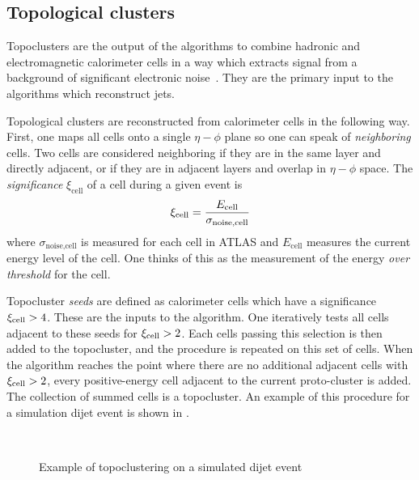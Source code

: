 \subsection{Topological clusters}\label{sec:topoclusters}

Topoclusters are the output of the algorithms to combine hadronic and electromagnetic calorimeter cells in a way which extracts signal from a background of significant electronic noise~\cite{PERF-2014-07}.
They are the primary input to the algorithms which reconstruct jets.

Topological clusters are reconstructed from calorimeter cells in the following way.
First, one maps all cells onto a single $\eta-\phi$ plane so one can speak of \textit{neighboring} cells.
Two cells are considered neighboring if they are in the same layer and directly adjacent, or if they are in adjacent layers and overlap in $\eta-\phi$ space.
The \textit{significance} $\xi_{\text{cell}}$ of a cell during a given event is
\begin{equation}
\xi_{\text{cell}} = \frac{E_{\text{cell}}}{\sigma_{\text{noise,cell}}}
\end{equation}
where $\sigma_{\text{noise,cell}}$ is measured for each cell in ATLAS and $E_{\text{cell}}$ measures the current energy level of the cell.
One thinks of this as the measurement of the energy \textit{over threshold} for the cell.

Topocluster \textit{seeds} are defined as calorimeter cells which have a significance $\xi_{\text{cell}} > 4 $.
These are the inputs to the algorithm.
One iteratively tests all cells adjacent to these seeds for $\xi_{\text{cell}} > 2$.
Each cells passing this selection is then added to the topocluster, and the procedure is repeated on this set of cells.
When the algorithm reaches the point where there are no additional adjacent cells with $\xi_{\text{cell}} > 2$, every positive-energy cell adjacent to the current proto-cluster is added.
The collection of summed cells is a topocluster.
An example of this procedure for a simulation dijet event is shown in .
\begin{figure}
\caption{Example of topoclustering on a simulated dijet event} \label{fig:topocluster}
 \\
\end{figure}

